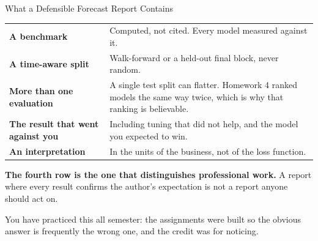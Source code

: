 \documentclass[aspectratio=169, 11pt]{beamer}
\begin{document}
\begin{frame}{What a Defensible Forecast Report Contains}
  \begin{center}
    {\small
    \begin{tabular}{p{3.4cm}p{8.9cm}}
      \toprule
      \textbf{A benchmark} & Computed, not cited. Every model measured against it. \\[2pt]
      \textbf{A time-aware split} & Walk-forward or a held-out final block, never random. \\[2pt]
      \textbf{More than one evaluation} & A single test split can flatter. Homework 4 ranked
      models the same way twice, which is why that ranking is believable. \\[2pt]
      \textbf{The result that went against you} & Including tuning that did not help, and the
      model you expected to win. \\[2pt]
      \textbf{An interpretation} & In the units of the business, not of the loss function. \\
      \bottomrule
    \end{tabular}
    }
  \end{center}

  \vspace{0.05cm}
  \textbf{The fourth row is the one that distinguishes professional work.} A report where every
  result confirms the author's expectation is not a report anyone should act on.

  \vspace{0.1cm}
  You have practiced this all semester: the assignments were built so the obvious answer is
  frequently the wrong one, and the credit was for noticing.
\end{frame}
\end{document}
